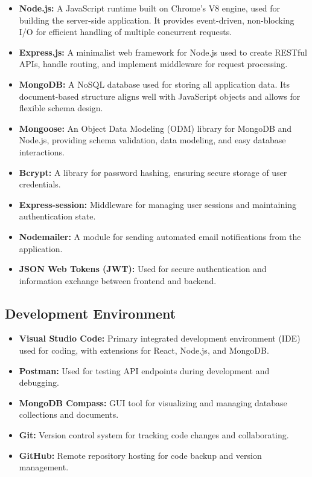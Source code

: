 \documentclass[12pt,a4paper]{report}
\begin{document}
\begin{itemize}
    \item \textbf{Node.js:} A JavaScript runtime built on Chrome's V8 engine, used for building the server-side application. It provides event-driven, non-blocking I/O for efficient handling of multiple concurrent requests.
    
    \item \textbf{Express.js:} A minimalist web framework for Node.js used to create RESTful APIs, handle routing, and implement middleware for request processing.
    
    \item \textbf{MongoDB:} A NoSQL database used for storing all application data. Its document-based structure aligns well with JavaScript objects and allows for flexible schema design.
    
    \item \textbf{Mongoose:} An Object Data Modeling (ODM) library for MongoDB and Node.js, providing schema validation, data modeling, and easy database interactions.
    
    \item \textbf{Bcrypt:} A library for password hashing, ensuring secure storage of user credentials.
    
    \item \textbf{Express-session:} Middleware for managing user sessions and maintaining authentication state.
    
    \item \textbf{Nodemailer:} A module for sending automated email notifications from the application.
    
    \item \textbf{JSON Web Tokens (JWT):} Used for secure authentication and information exchange between frontend and backend.
\end{itemize}

\subsection{Development Environment}

\begin{itemize}
    \item \textbf{Visual Studio Code:} Primary integrated development environment (IDE) used for coding, with extensions for React, Node.js, and MongoDB.
    
    \item \textbf{Postman:} Used for testing API endpoints during development and debugging.
    
    \item \textbf{MongoDB Compass:} GUI tool for visualizing and managing database collections and documents.
    
    \item \textbf{Git:} Version control system for tracking code changes and collaborating.
    
    \item \textbf{GitHub:} Remote repository hosting for code backup and version management.
\end{itemize}
\end{document}
